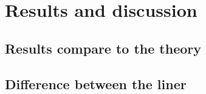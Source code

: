 \section{Results and discussion}
\subsection{Results compare to the theory}
\subsection{Difference between the liner}
\clearpage
